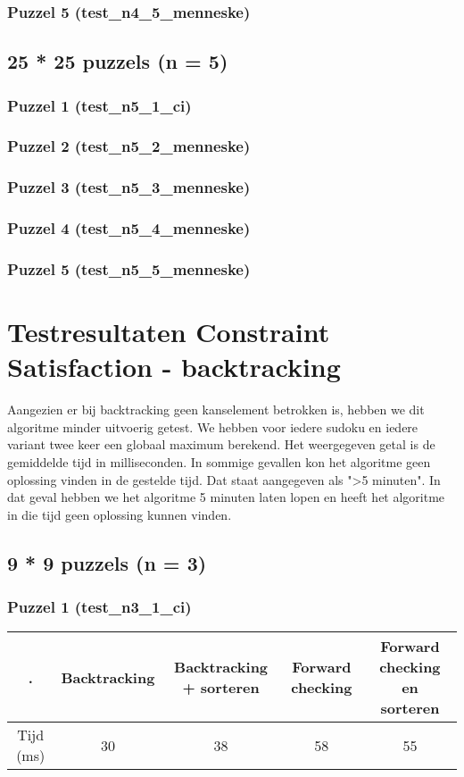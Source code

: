\documentclass[]{report}
\begin{document}
\begin{appendices}
\subsection{Puzzel 5 (test\_n4\_5\_menneske)}
\section{25 * 25 puzzels (n = 5)}
\subsection{Puzzel 1 (test\_n5\_1\_ci)}

\subsection{Puzzel 2 (test\_n5\_2\_menneske)}
\subsection{Puzzel 3 (test\_n5\_3\_menneske)}
\subsection{Puzzel 4 (test\_n5\_4\_menneske)}
\subsection{Puzzel 5 (test\_n5\_5\_menneske)}

\chapter{Testresultaten Constraint Satisfaction - backtracking}
Aangezien er bij backtracking geen kanselement betrokken is, hebben we dit algoritme minder uitvoerig getest. We hebben voor iedere sudoku en iedere variant twee keer een globaal maximum berekend. Het weergegeven getal is de gemiddelde tijd in milliseconden. In sommige gevallen kon het algoritme geen oplossing vinden in de gestelde tijd. Dat staat aangegeven als ">5 minuten". In dat geval hebben we het algoritme 5 minuten laten lopen en heeft het algoritme in die tijd geen oplossing kunnen vinden.
\section{9 * 9 puzzels (n = 3)}
\subsection{Puzzel 1 (test\_n3\_1\_ci)}
\begin{tabular}{|c||c|c|c|c|}
\hline . & Backtracking & Backtracking + sorteren & Forward checking & Forward checking en sorteren \\ 
\hline \hline Tijd (ms) & 30 & 38 & 58 & 55 \\ 
\hline 
\end{tabular}

\end{appendices}
\end{document}
